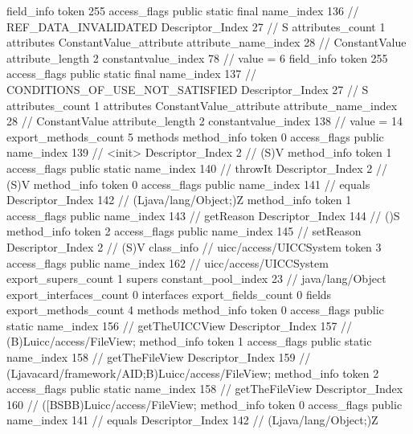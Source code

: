 {{{{{{{				}
				}
			}
			field_info {
				token	255
				access_flags	public static final
				name_index	136		// REF_DATA_INVALIDATED
				Descriptor_Index	27		// S
				attributes_count	1
				attributes {
				ConstantValue_attribute {
					attribute_name_index	28		// ConstantValue
					attribute_length	2
					constantvalue_index	78		// value = 6
				}
				}
			}
			field_info {
				token	255
				access_flags	public static final
				name_index	137		// CONDITIONS_OF_USE_NOT_SATISFIED
				Descriptor_Index	27		// S
				attributes_count	1
				attributes {
				ConstantValue_attribute {
					attribute_name_index	28		// ConstantValue
					attribute_length	2
					constantvalue_index	138		// value = 14
				}
				}
			}
			}
			export_methods_count	5
			methods {
				method_info {
					token	0
					access_flags	public
					name_index	139		// <init>
					Descriptor_Index	2		// (S)V
				}
				method_info {
					token	1
					access_flags	public static
					name_index	140		// throwIt
					Descriptor_Index	2		// (S)V
				}
				method_info {
					token	0
					access_flags	public
					name_index	141		// equals
					Descriptor_Index	142		// (Ljava/lang/Object;)Z
				}
				method_info {
					token	1
					access_flags	public
					name_index	143		// getReason
					Descriptor_Index	144		// ()S
				}
				method_info {
					token	2
					access_flags	public
					name_index	145		// setReason
					Descriptor_Index	2		// (S)V
				}
			}
		}
		class_info {		// uicc/access/UICCSystem
			token	3
			access_flags	public
			name_index	162		// uicc/access/UICCSystem
			export_supers_count	1
			supers {
				constant_pool_index	23		// java/lang/Object
			}
			export_interfaces_count	0
			interfaces {
			}
			export_fields_count	0
			fields {
			}
			export_methods_count	4
			methods {
				method_info {
					token	0
					access_flags	public static
					name_index	156		// getTheUICCView
					Descriptor_Index	157		// (B)Luicc/access/FileView;
				}
				method_info {
					token	1
					access_flags	public static
					name_index	158		// getTheFileView
					Descriptor_Index	159		// (Ljavacard/framework/AID;B)Luicc/access/FileView;
				}
				method_info {
					token	2
					access_flags	public static
					name_index	158		// getTheFileView
					Descriptor_Index	160		// ([BSBB)Luicc/access/FileView;
				}
				method_info {
					token	0
					access_flags	public
					name_index	141		// equals
					Descriptor_Index	142		// (Ljava/lang/Object;)Z
				}
			}
		}
	}
}
